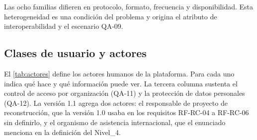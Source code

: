 \documentclass[11pt,letterpaper]{article}
\begin{document}
Las ocho familias difieren en protocolo, formato, frecuencia y disponibilidad. Esta heterogeneidad
es una condición del problema y origina el atributo de interoperabilidad y el escenario QA-09.

\subsection{Clases de usuario y actores}
\label{sec:actores}

El \cref{tab:actores} define los actores humanos de la plataforma. Para cada uno indica qué hace y
qué información puede ver. La tercera columna sustenta el control de acceso por organización
(QA-11) y la protección de datos personales (QA-12). La versión 1.1 agrega dos actores: el
responsable de proyecto de reconstrucción, que la versión 1.0 usaba en los requisitos RF-RC-04 a
RF-RC-06 sin definirlo, y el organismo de asistencia internacional, que el enunciado menciona en la
definición del Nivel\_4.
\end{document}

